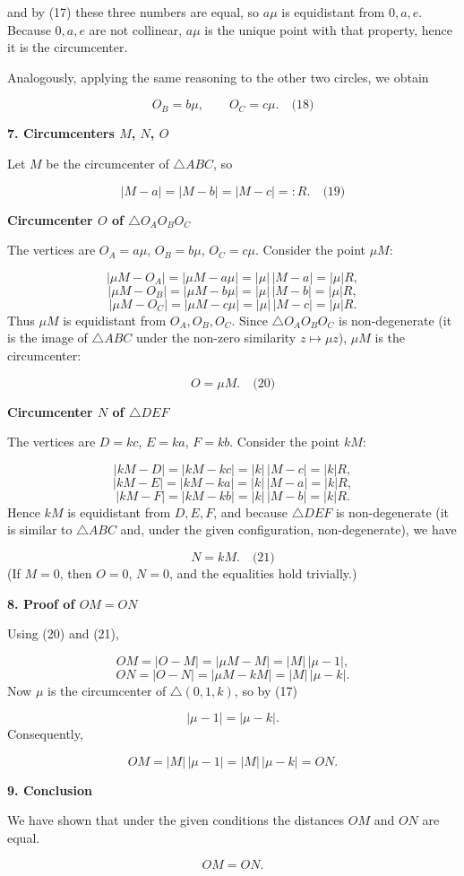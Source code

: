 \documentclass{llmxive}
\providecommand{\solutionheading}[1]{\par\smallskip\noindent\textbf{#1}\par}
\begin{document}
and by (17) these three numbers are equal, so \(a\mu\) is equidistant from \(0,a,e\). Because \(0,a,e\) are not collinear, \(a\mu\) is the unique point with that property, hence it is the circumcenter.\par
Analogously, applying the same reasoning to the other two circles, we obtain\par
\[
O_B = b \mu,\qquad O_C = c \mu. \quad\text{(18)}
\]
\smallskip
\solutionheading{7. Circumcenters \(M\), \(N\), \(O\)}
Let \(M\) be the circumcenter of \(\triangle ABC\), so\par
\[
|M - a| = |M - b| = |M - c| =: R. \quad\text{(19)}
\]
\solutionheading{Circumcenter \(O\) of \(\triangle O_A O_B O_C\)}
The vertices are \(O_A = a\mu\), \(O_B = b\mu\), \(O_C = c\mu\). Consider the point \(\mu M\):\par
\[
|\mu M - O_A| = |\mu M - a\mu| = |\mu|\,|M - a| = |\mu| R,
\]
\[
|\mu M - O_B| = |\mu M - b\mu| = |\mu|\,|M - b| = |\mu| R,
\]
\[
|\mu M - O_C| = |\mu M - c\mu| = |\mu|\,|M - c| = |\mu| R.
\]
Thus \(\mu M\) is equidistant from \(O_A,O_B,O_C\). Since \(\triangle O_A O_B O_C\) is non-degenerate (it is the image of \(\triangle ABC\) under the non-zero similarity \(z \mapsto \mu z\)), \(\mu M\) is the circumcenter:\par
\[
O = \mu M. \quad\text{(20)}
\]
\solutionheading{Circumcenter \(N\) of \(\triangle DEF\)}
The vertices are \(D = k c\), \(E = k a\), \(F = k b\). Consider the point \(k M\):\par
\[
|k M - D| = |k M - k c| = |k|\,|M - c| = |k| R,
\]
\[
|k M - E| = |k M - k a| = |k|\,|M - a| = |k| R,
\]
\[
|k M - F| = |k M - k b| = |k|\,|M - b| = |k| R.
\]
Hence \(k M\) is equidistant from \(D,E,F\), and because \(\triangle DEF\) is non-degenerate (it is similar to \(\triangle ABC\) and, under the given configuration, non-degenerate), we have\par
\[
N = k M. \quad\text{(21)}
\]
(If \(M = 0\), then \(O = 0\), \(N = 0\), and the equalities hold trivially.)\par
\smallskip
\solutionheading{8. Proof of \(OM = ON\)}
Using (20) and (21),\par
\[
OM = |O - M| = |\mu M - M| = |M|\,|\mu - 1|,
\]
\[
ON = |O - N| = |\mu M - k M| = |M|\,|\mu - k|.
\]
Now \(\mu\) is the circumcenter of \(\triangle (0,1,k)\), so by (17)\par
\[
|\mu - 1| = |\mu - k|.
\]
Consequently,\par
\[
OM = |M|\,|\mu - 1| = |M|\,|\mu - k| = ON.
\]
\smallskip
\solutionheading{9. Conclusion}
We have shown that under the given conditions the distances \(OM\) and \(ON\) are equal.\par
\[
\boxed{OM = ON}.
\]
\par
\end{document}
